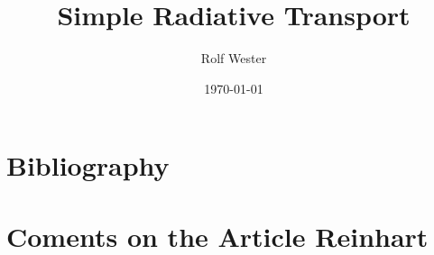 \documentclass[fleqn]{scrartcl}
\title{Simple Radiative Transport}
\author{Rolf Wester}
\date{\today}
\begin{document}
\maketitle
\tableofcontents

\graphicspath{{figures/} }






\newpage
\section{Bibliography}
\printbibliography[heading=none]  

\newpage
\appendix


\newpage
%


\section{Coments on the Article Reinhart}

%
\end{document}
